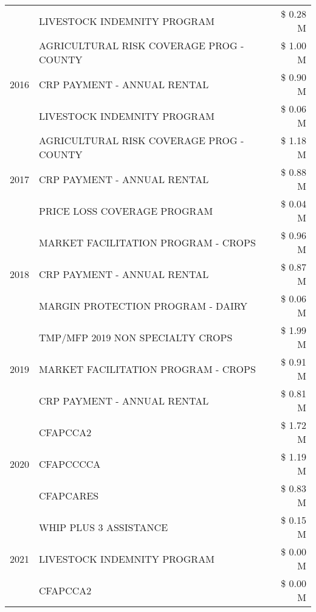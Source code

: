 \begin{tabular}{llr}
 & LIVESTOCK INDEMNITY PROGRAM & \$ 0.28 M \\
\cline{1-3}
\multirow[t]{3}{*}{2016} & AGRICULTURAL RISK COVERAGE PROG - COUNTY & \$ 1.00 M \\
 & CRP PAYMENT - ANNUAL RENTAL & \$ 0.90 M \\
 & LIVESTOCK INDEMNITY PROGRAM & \$ 0.06 M \\
\cline{1-3}
\multirow[t]{3}{*}{2017} & AGRICULTURAL RISK COVERAGE PROG - COUNTY & \$ 1.18 M \\
 & CRP PAYMENT - ANNUAL RENTAL & \$ 0.88 M \\
 & PRICE LOSS COVERAGE PROGRAM & \$ 0.04 M \\
\cline{1-3}
\multirow[t]{3}{*}{2018} & MARKET FACILITATION PROGRAM - CROPS & \$ 0.96 M \\
 & CRP PAYMENT - ANNUAL RENTAL & \$ 0.87 M \\
 & MARGIN PROTECTION PROGRAM - DAIRY & \$ 0.06 M \\
\cline{1-3}
\multirow[t]{3}{*}{2019} & TMP/MFP 2019 NON SPECIALTY CROPS & \$ 1.99 M \\
 & MARKET FACILITATION PROGRAM - CROPS & \$ 0.91 M \\
 & CRP PAYMENT - ANNUAL RENTAL & \$ 0.81 M \\
\cline{1-3}
\multirow[t]{3}{*}{2020} & CFAPCCA2 & \$ 1.72 M \\
 & CFAPCCCCA & \$ 1.19 M \\
 & CFAPCARES & \$ 0.83 M \\
\cline{1-3}
\multirow[t]{3}{*}{2021} & WHIP PLUS 3 ASSISTANCE & \$ 0.15 M \\
 & LIVESTOCK INDEMNITY PROGRAM & \$ 0.00 M \\
 & CFAPCCA2 & \$ 0.00 M \\
\cline{1-3}
\bottomrule
\end{tabular}
